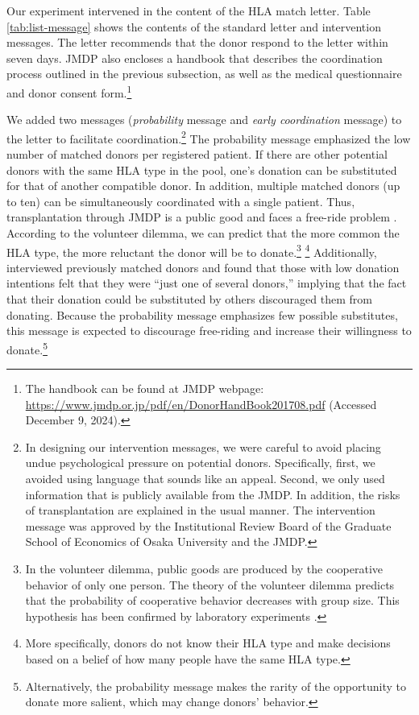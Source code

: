 \documentclass[12pt, a4paper]{article}
\begin{document}
Our experiment intervened in the content of the HLA match letter. Table \ref{tab:list-message} shows the contents of the standard letter and intervention messages. The letter recommends that the donor respond to the letter within seven days. JMDP also encloses a handbook that describes the coordination process outlined in the previous subsection, as well as the medical questionnaire and donor consent form.\footnote{The handbook can be found at JMDP webpage: \url{https://www.jmdp.or.jp/pdf/en/DonorHandBook201708.pdf} (Accessed December 9, 2024).}

We added two messages (\emph{probability} message and \emph{early coordination} message) to the letter to facilitate coordination.\footnote{In designing our intervention messages, we were careful to avoid placing undue psychological pressure on potential donors. Specifically, first, we avoided using language that sounds like an appeal. Second, we only used information that is publicly available from the JMDP. In addition, the risks of transplantation are explained in the usual manner. The intervention message was approved by the Institutional Review Board of the Graduate School of Economics of Osaka University and the JMDP.} The probability message emphasized the low number of matched donors per registered patient. If there are other potential donors with the same HLA type in the pool, one's donation can be substituted for that of another compatible donor. In addition, multiple matched donors (up to ten) can be simultaneously coordinated with a single patient. Thus, transplantation through JMDP is a public good and faces a free-ride problem \citep{Bergstrom2009}. According to the volunteer dilemma, we can predict that the more common the HLA type, the more reluctant the donor will be to donate.\footnote{In the volunteer dilemma, public goods are produced by the cooperative behavior of only one person. The theory of the volunteer dilemma predicts that the probability of cooperative behavior decreases with group size. This hypothesis has been confirmed by laboratory experiments \citep{Diekmann1985, Diekmann1986, Goeree2017}.} \footnote{More specifically, donors do not know their HLA type and make decisions based on a belief of how many people have the same HLA type.} Additionally, \citet{Kurosawa2022} interviewed previously matched donors and found that those with low donation intentions felt that they were ``just one of several donors,'' implying that the fact that their donation could be substituted by others discouraged them from donating. Because the probability message emphasizes few possible substitutes, this message is expected to discourage free-riding and increase their willingness to donate.\footnote{Alternatively, the probability message makes the rarity of the opportunity to donate more salient, which may change donors' behavior.}
\end{document}
